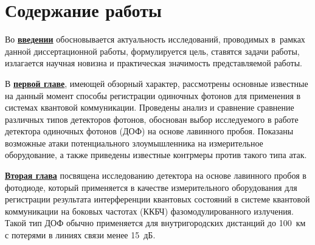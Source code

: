 

 \section*{Содержание работы}
 Во \underline{\textbf{введении}} обосновывается актуальность
 исследований, проводимых в~рамках данной диссертационной работы,
  формулируется цель, ставятся задачи работы, излагается научная новизна
 и практическая значимость представляемой работы. 

 В \underline{\textbf{первой главе}}, имеющей обзорный характер, рассмотрены основные известные на данный момент способы регистрации одиночных фотонов для применения в системах квантовой коммуникации. Проведены анализ и сравнение сравнение различных типов детекторов фотонов, обоснован выбор исследуемого в работе детектора одиночных фотонов (ДОФ) на основе лавинного пробоя. Показаны возможные атаки потенциального злоумышленника на измерительное оборудование, а также приведены известные контрмеры против такого типа атак.



 \underline{\textbf{Вторая глава}} посвящена исследованию детектора на основе лавинного пробоя в фотодиоде, который применяется в качестве измерительного оборудования для регистрации результата интерференции квантовых состояний в системе квантовой коммуникации на боковых частотах (ККБЧ) фазомодулированного излучения. Такой тип ДОФ обычно применяется для внутригородских дистанций до 100~км с потерями в линиях связи менее 15~дБ. 

